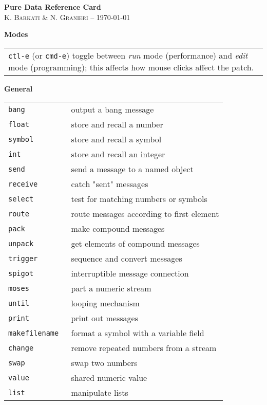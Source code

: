 \documentclass[a4paper, landscape, 10pt]{article}
\newcommand{\refcardtitle}[1]{
  \begin{center}
    \textbf{\small{#1}}
  \end{center}
}
\begin{document}
\begin{multicols}{3}

  \begin{center}
    \Large{\textbf{Pure Data Reference Card}} \\
    \small{K. \textsc{Barkati} \& N. \textsc{Granieri} -- \today} 
  \end{center}

  \footnotesize

  \refcardtitle{Modes}
  \begin{tabularx}{9.1cm}{X}
    \texttt{ctl-e} (or \texttt{cmd-e}) toggle between \emph{run} mode (performance) and \emph{edit} mode (programming); this affects how mouse clicks affect the patch.
  \end{tabularx}

  \refcardtitle{General}
  \begin{tabularx}{9cm}{>{\tt}l X}
    bang & output a bang message \\
    float & store and recall a number  \\
    symbol & store and recall a symbol \\
    int & store and recall an integer  \\
    send & send a message to a named object  \\
    receive & catch "sent" messages  \\
    select & test for matching numbers or symbols  \\
    route & route messages according to first element  \\
    pack & make compound messages  \\
    unpack & get elements of compound messages  \\
    trigger & sequence and convert messages  \\
    spigot & interruptible message connection  \\
    moses & part a numeric stream  \\
    until & looping mechanism  \\
    print & print out messages  \\
    makefilename & format a symbol with a variable field  \\
    change & remove repeated numbers from a stream  \\
    swap & swap two numbers  \\
    value & shared numeric value \\
    list & manipulate lists \\
  \end{tabularx}


\end{multicols}
\end{document}
